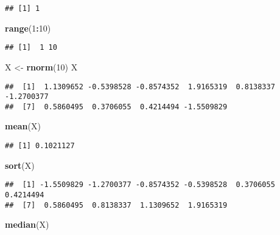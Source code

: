 \documentclass[]{article}
\newenvironment{Shaded}{\begin{snugshade}}{\end{snugshade}}
\newcommand{\KeywordTok}[1]{\textcolor[rgb]{0.13,0.29,0.53}{\textbf{#1}}}
\newcommand{\DecValTok}[1]{\textcolor[rgb]{0.00,0.00,0.81}{#1}}
\newcommand{\StringTok}[1]{\textcolor[rgb]{0.31,0.60,0.02}{#1}}
\newcommand{\OperatorTok}[1]{\textcolor[rgb]{0.81,0.36,0.00}{\textbf{#1}}}
\newcommand{\NormalTok}[1]{#1}
\begin{document}
\begin{verbatim}
## [1] 1
\end{verbatim}

\begin{Shaded}
\begin{Highlighting}[]
\KeywordTok{range}\NormalTok{(}\DecValTok{1}\OperatorTok{:}\DecValTok{10}\NormalTok{)}
\end{Highlighting}
\end{Shaded}

\begin{verbatim}
## [1]  1 10
\end{verbatim}

\begin{Shaded}
\begin{Highlighting}[]
\NormalTok{X <-}\StringTok{ }\KeywordTok{rnorm}\NormalTok{(}\DecValTok{10}\NormalTok{)}
\NormalTok{X}
\end{Highlighting}
\end{Shaded}

\begin{verbatim}
##  [1]  1.1309652 -0.5398528 -0.8574352  1.9165319  0.8138337 -1.2700377
##  [7]  0.5860495  0.3706055  0.4214494 -1.5509829
\end{verbatim}

\begin{Shaded}
\begin{Highlighting}[]
\KeywordTok{mean}\NormalTok{(X)}
\end{Highlighting}
\end{Shaded}

\begin{verbatim}
## [1] 0.1021127
\end{verbatim}

\begin{Shaded}
\begin{Highlighting}[]
\KeywordTok{sort}\NormalTok{(X)}
\end{Highlighting}
\end{Shaded}

\begin{verbatim}
##  [1] -1.5509829 -1.2700377 -0.8574352 -0.5398528  0.3706055  0.4214494
##  [7]  0.5860495  0.8138337  1.1309652  1.9165319
\end{verbatim}

\begin{Shaded}
\begin{Highlighting}[]
\KeywordTok{median}\NormalTok{(X)}
\end{Highlighting}
\end{Shaded}
\end{document}
